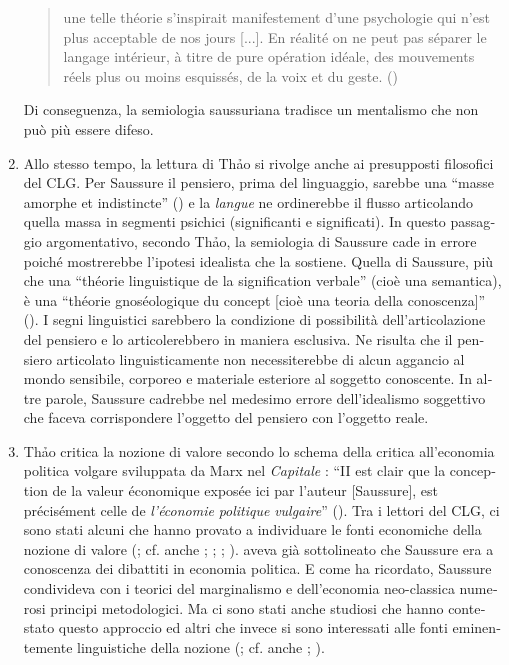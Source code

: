 \documentclass[output=paper]{../langscibook}
\begin{document}
\begin{otherlanguage}{italian}
\begin{enumerate}
\begin{quote} 
    une telle théorie s’inspirait manifestement d’une psychologie qui n’est plus acceptable de nos jours [...]. En réalité on ne peut pas séparer le langage intérieur, à titre de pure opération idéale, des mouvements réels plus ou moins esquissés, de la voix et du geste. (\citealt[25--26]{thao_phenomenologie_1975})
\end{quote}
Di conseguenza, la semiologia saussuriana tradisce un mentalismo che non può più essere difeso.


\item Allo stesso tempo, la lettura di Th\textlatin{ả}o si rivolge anche ai presupposti filosofici del CLG. Per Saussure il pensiero, prima del linguaggio, sarebbe una “masse amorphe et indistincte” (\citealt[155]{saussure_cours_1995}) e la \textit{langue} ne ordinerebbe il flusso articolando quella massa in segmenti psichici (significanti e significati). In questo passaggio argomentativo, secondo Th\textlatin{ả}o, la semiologia di Saussure cade in errore poiché mostrerebbe l’ipotesi idealista che la sostiene. Quella di Saussure, più che una “théorie linguistique de la signification verbale” (cioè una semantica), è una “théorie gnoséologique du concept [cioè una teoria della conoscenza]” (\citealt[41]{thao_phenomenologie_1974}). I segni linguistici sarebbero la condizione di possibilità dell’articolazione del pensiero e lo articolerebbero in maniera esclusiva. Ne risulta che il pensiero articolato linguisticamente non necessiterebbe di alcun aggancio al mondo sensibile, corporeo e materiale esteriore al soggetto conoscente. In altre parole, Saussure cadrebbe nel medesimo errore dell’idealismo soggettivo che faceva corrispondere l’oggetto del pensiero con l’oggetto reale.

\item Th\textlatin{ả}o critica la nozione di valore secondo lo schema della critica all’economia politica volgare sviluppata da Marx nel \textit{Capitale} \citep{marx_kapital._1867}: “II est clair que la conception de la valeur économique exposée ici par l’auteur [Saussure], est précisément celle de \textit{l’économie} \textit{politique} \textit{vulgaire}” (\citealt[42]{thao_phenomenologie_1974}). Tra i lettori del CLG, ci sono stati alcuni che hanno provato a individuare le fonti economiche della nozione di valore (\citealt[68]{koerner_ferdinand_1973}; cf. anche \citealt[541]{sljusareva_notion_1980}; \citealt[2]{ponzio_valeur_2005}; \citealt{ponzio_linguistica_2015}; \citealt{joseph_saussures_2014}). \citet[n. 165]{de_mauro_note_2011} aveva già sottolineato che Saussure era a conoscenza dei dibattiti in economia politica. E come \citet{ponzio_valeur_2005} ha ricordato, Saussure condivideva con i teorici del marginalismo e dell’economia neo-classica numerosi principi metodologici. Ma ci sono stati anche studiosi che hanno contestato questo approccio \citep[235]{godel_les_1957} ed altri che invece si sono interessati alle fonti eminentemente linguistiche della nozione (\citealt[295]{auroux_deux_1985}; cf. anche \citealt[329]{swiggers_girard_1982}; \citealt{hasler_notion_2007}). 


\end{enumerate}
\end{otherlanguage}
\end{document}
